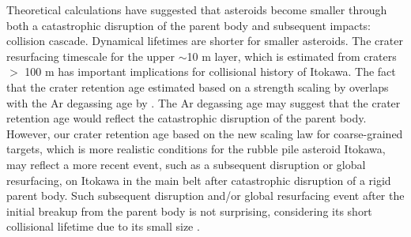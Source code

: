 \documentclass[3p,authoryear]{elsarticle}
\begin{document}
Theoretical calculations have suggested that asteroids become smaller through both a catastrophic disruption of the parent body and subsequent impacts: collision cascade. Dynamical lifetimes are shorter for smaller asteroids. The crater resurfacing timescale for the upper $\sim$10 m layer, which is estimated from craters $>$ 100 m has important implications for collisional history of Itokawa. The fact that the crater retention age estimated based on a strength scaling by \citet{michel2009} overlaps with the Ar degassing age by \citet{park2015}. The Ar degassing age may suggest that the crater retention age would reflect the catastrophic disruption of the parent body. However, our crater retention age based on the new scaling law for coarse-grained targets, which is more realistic conditions for the rubble pile asteroid Itokawa, may reflect a more recent event, such as a subsequent disruption or global resurfacing, on Itokawa in the main belt after catastrophic disruption of a rigid parent body. Such subsequent disruption and/or global resurfacing event after the initial breakup from the parent body is not surprising, considering its short collisional lifetime due to its small size \citep[e.g.,][]{obrien2005}.
\end{document}
